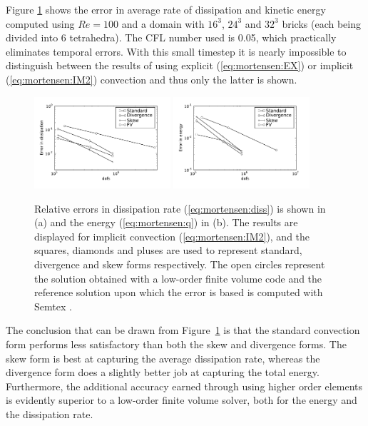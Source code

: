 Figure \ref{fig:mortensen:dissipation} shows the error in average rate of dissipation and kinetic energy computed using $Re=100$ and a  domain with $16^3$, $24^3$ and $32^3$ bricks (each being divided into 6 tetrahedra). The CFL number used is 0.05, which practically eliminates temporal errors. With this small timestep it is nearly impossible to distinguish between the results of using explicit (\eqref{eq:mortensen:EX}) or implicit (\eqref{eq:mortensen:IM2}) convection and thus only the latter is shown.
\begin{figure}
\includegraphics[width=0.45\textwidth]{chapters/mortensen/pdf/TG_disserror_model_0_cfl_0_05_Re_100_dofs.pdf}
\includegraphics[width=0.45\textwidth]{chapters/mortensen/pdf/TG_energyerror_model_0_cfl_0_05_Re_100_dofs.pdf}
  \caption{Relative errors in dissipation rate (\eqref{eq:mortensen:diss}) is shown in (a) and the energy (\eqref{eq:mortensen:q}) in (b). The results are displayed for implicit convection (\eqref{eq:mortensen:IM2}), and the squares, diamonds and pluses are used to represent standard, divergence and skew forms respectively. The open circles represent the solution obtained with a low-order finite volume code and the reference solution upon which the error is based is computed with Semtex \cite{Semtex}. }
  \label{fig:mortensen:dissipation}
\end{figure}
The conclusion that can be drawn from Figure~\ref{fig:mortensen:dissipation} is that the standard convection form performs less satisfactory than both the skew and divergence forms. The skew form is best at capturing the average dissipation rate, whereas the divergence form does a slightly better job at capturing the total energy. Furthermore, the additional accuracy earned through using higher order elements is evidently superior to a low-order finite volume solver, both for the energy and the dissipation rate.

